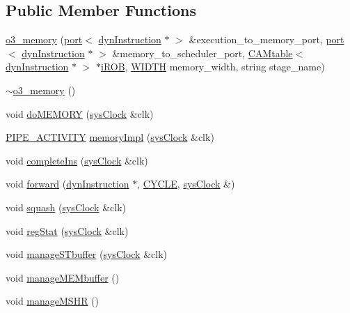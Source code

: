 \subsection*{Public Member Functions}
\begin{DoxyCompactItemize}
\item 
\hyperlink{classo3__memory_aa34c08bd63c8de093d6df7e9022045fe}{o3\_\-memory} (\hyperlink{classport}{port}$<$ \hyperlink{classdynInstruction}{dynInstruction} $\ast$ $>$ \&execution\_\-to\_\-memory\_\-port, \hyperlink{classport}{port}$<$ \hyperlink{classdynInstruction}{dynInstruction} $\ast$ $>$ \&memory\_\-to\_\-scheduler\_\-port, \hyperlink{classCAMtable}{CAMtable}$<$ \hyperlink{classdynInstruction}{dynInstruction} $\ast$ $>$ $\ast$\hyperlink{backend_2parser_8cpp_ad73ae25f81e6e99482f3fbd5ba9664ce}{iROB}, \hyperlink{global_2global_8h_a6fa2e24b8a418fa215e183264cbea3aa}{WIDTH} memory\_\-width, string stage\_\-name)
\item 
\hyperlink{classo3__memory_a084e09aa6674090d325f82ce9a184fa3}{$\sim$o3\_\-memory} ()
\item 
void \hyperlink{classo3__memory_a14fb30065edbb1758d0e4c9ac3f92433}{doMEMORY} (\hyperlink{classsysClock}{sysClock} \&clk)
\item 
\hyperlink{unit_2stage_8h_ab00e4188e8b8974fecb1dfd12764cbb1}{PIPE\_\-ACTIVITY} \hyperlink{classo3__memory_ad44b31e95afd6e63f85401be8e58318d}{memoryImpl} (\hyperlink{classsysClock}{sysClock} \&clk)
\item 
void \hyperlink{classo3__memory_acbf1c9b78534fad182e6d2ac3453b98b}{completeIns} (\hyperlink{classsysClock}{sysClock} \&clk)
\item 
void \hyperlink{classo3__memory_a755d83e89f2fc0d95db93d688c40b9a4}{forward} (\hyperlink{classdynInstruction}{dynInstruction} $\ast$, \hyperlink{global_2global_8h_a7e19a550ec11d1ed921deb20c22efb5b}{CYCLE}, \hyperlink{classsysClock}{sysClock} \&)
\item 
void \hyperlink{classo3__memory_ab2f9b9b56a73d1f14564f68680fc9fc4}{squash} (\hyperlink{classsysClock}{sysClock} \&clk)
\item 
void \hyperlink{classo3__memory_a806f0676eb61e344a0feb87fd823779a}{regStat} (\hyperlink{classsysClock}{sysClock} \&clk)
\item 
void \hyperlink{classo3__memory_a91a7367c72346b355709afddef9296bf}{manageSTbuffer} (\hyperlink{classsysClock}{sysClock} \&clk)
\item 
void \hyperlink{classo3__memory_a826fdfa882dd202970984027e32e2c33}{manageMEMbuffer} ()
\item 
void \hyperlink{classo3__memory_adcda5a9a18c362c89d469abd355ae1a1}{manageMSHR} ()
\end{DoxyCompactItemize}


